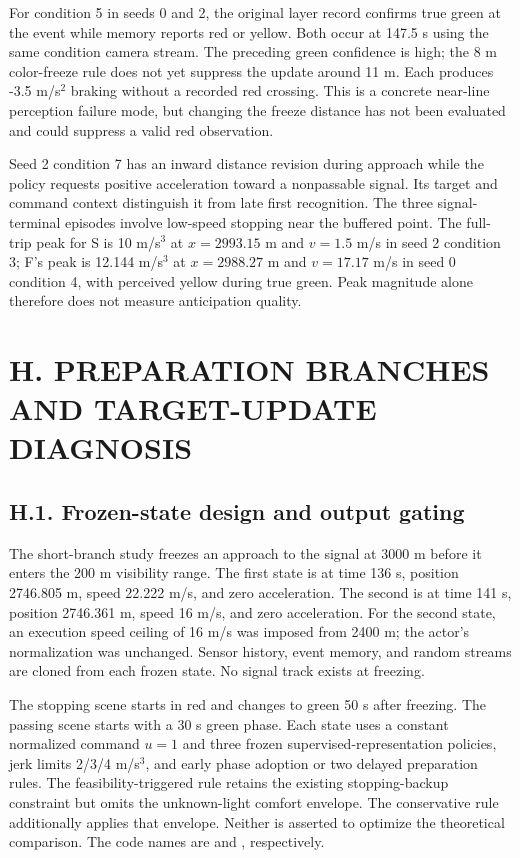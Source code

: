 \documentclass[letterpaper,journal,onecolumn]{IEEEtran}
\begin{document}
For condition 5 in seeds 0 and 2, the original layer record confirms true green at the event while memory reports red or yellow. Both occur at 147.5 s using the same condition camera stream. The preceding green confidence is high; the 8 m color-freeze rule does not yet suppress the update around 11 m. Each produces -3.5 m/s\(^2\) braking without a recorded red crossing. This is a concrete near-line perception failure mode, but changing the freeze distance has not been evaluated and could suppress a valid red observation.

Seed 2 condition 7 has an inward distance revision during approach while the policy requests positive acceleration toward a nonpassable signal. Its target and command context distinguish it from late first recognition. The three signal-terminal episodes involve low-speed stopping near the buffered point. The full-trip peak for S is 10 m/s\(^3\) at \(x=2993.15\) m and \(v=1.5\) m/s in seed 2 condition 3; F's peak is 12.144 m/s\(^3\) at \(x=2988.27\) m and \(v=17.17\) m/s in seed 0 condition 4, with perceived yellow during true green. Peak magnitude alone therefore does not measure anticipation quality.

\FloatBarrier{}\section*{H. PREPARATION BRANCHES AND TARGET-UPDATE DIAGNOSIS}\setcounter{subsection}{0}

\subsection*{H.1. Frozen-state design and output gating}

The short-branch study freezes an approach to the signal at 3000 m before it enters the 200 m visibility range. The first state is at time 136 s, position 2746.805 m, speed 22.222 m/s, and zero acceleration. The second is at time 141 s, position 2746.361 m, speed 16 m/s, and zero acceleration. For the second state, an execution speed ceiling of 16 m/s was imposed from 2400 m; the actor's normalization was unchanged. Sensor history, event memory, and random streams are cloned from each frozen state. No signal track exists at freezing.

The stopping scene starts in red and changes to green 50 s after freezing. The passing scene starts with a 30 s green phase. Each state uses a constant normalized command \(u=1\) and three frozen supervised-representation policies, jerk limits 2/3/4 m/s\(^3\), and early phase adoption or two delayed preparation rules. The feasibility-triggered rule retains the existing stopping-backup constraint but omits the unknown-light comfort envelope. The conservative rule additionally applies that envelope. Neither is asserted to optimize the theoretical comparison. The code names are  and , respectively.
\end{document}
